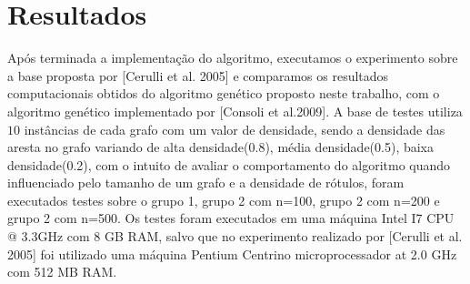 \documentclass[12pt]{article}
\begin{document}
	\section{Resultados}\label{sec:resultados}

	Após terminada a implementação do algoritmo, executamos o experimento sobre a base proposta por [Cerulli et al. 2005] e comparamos os resultados computacionais obtidos do algoritmo genético proposto neste trabalho, com o algoritmo genético implementado por [Consoli et al.2009]. A base de testes utiliza $10$ instâncias de cada grafo com um valor de densidade, sendo a densidade das aresta no grafo variando de alta densidade(0.8), média densidade(0.5), baixa densidade(0.2), com o intuito de avaliar o comportamento do algoritmo quando influenciado pelo tamanho de um grafo e a densidade de rótulos, foram executados testes sobre o grupo 1, grupo 2 com n=100, grupo 2 com n=200 e grupo 2 com n=500.
	Os testes foram executados em uma máquina Intel I7 CPU @ 3.3GHz com 8 GB RAM, salvo que no experimento realizado por [Cerulli et al. 2005] foi utilizado uma máquina Pentium Centrino microprocessador at 2.0 GHz com 512 MB RAM.
\end{document}
